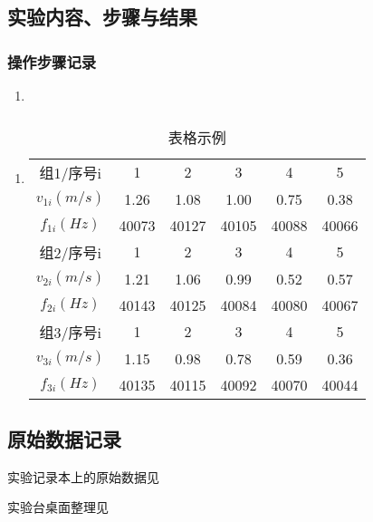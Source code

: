 \documentclass[dvipsnames, svgnames,a4paper,11pt]{article}
\begin{document}
	\subsection{实验内容、步骤与结果}
	
	\subsubsection{操作步骤记录}
	\begin{enumerate}
		\item 
	\end{enumerate}	
	
	\subsubsection{}
	\begin{enumerate}
		\item \begin{table}[h]
			\centering
			\caption{表格示例}
			\label{tab:tab1}
			\begin{tabular}{|c|c|c|c|c|c|}
				\hline
				组1/序号i & 1 & 2 & 3 & 4 & 5 \\
				$v_{1i}(m/s)$ & 1.26 & 1.08 & 1.00 & 0.75 & 0.38 \\
				$f_{1i}(Hz)$ & 40073 & 40127 & 40105 & 40088 & 40066 \\
				\hline
				组2/序号i & 1 & 2 & 3 & 4 & 5 \\
				$v_{2i}(m/s)$ & 1.21 & 1.06 & 0.99 & 0.52 & 0.57 \\
				$f_{2i}(Hz)$ & 40143 & 40125 & 40084 & 40080 & 40067 \\
				\hline
				组3/序号i & 1 & 2 & 3 & 4 & 5 \\
				$v_{3i}(m/s)$ & 1.15 & 0.98 & 0.78 & 0.59 & 0.36 \\
				$f_{3i}(Hz)$ & 40135 & 40115 & 40092 & 40070 & 40044 \\
				\hline
			\end{tabular}
		\end{table}		
	\end{enumerate}
	
	
	\clearpage
	\subsection{原始数据记录}
	实验记录本上的原始数据见%
	
	实验台桌面整理见%
	
\end{document}
